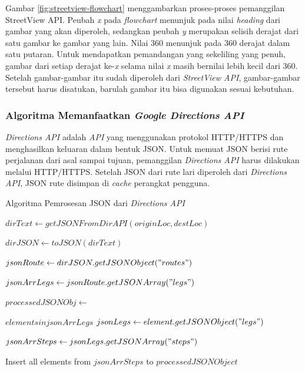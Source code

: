 Gambar \ref{fig:streetview-flowchart} menggambarkan proses-proses pemanggilan StreetView API. Peubah \textit{x} pada \textit{flowchart} menunjuk pada nilai \textit{heading} dari gambar yang akan diperoleh, sedangkan peubah \textit{y} merupakan selisih derajat dari satu gambar ke gambar yang lain. Nilai 360 menunjuk pada 360 derajat dalam satu putaran. Untuk mendapatkan pemandangan yang sekeliling yang penuh, gambar dari setiap derajat ke-\textit{x} selama nilai \textit{x} masih bernilai lebih kecil dari 360. Setelah gambar-gambar  itu sudah diperoleh dari \textit{StreetView API}, gambar-gambar tersebut harus disatukan, barulah gambar itu bisa digunakan sesuai kebutuhan.


\subsubsection{Algoritma Memanfaatkan \textit{Google Directions API}}
\textit{Directions API} adalah \textit{API} yang menggunakan protokol HTTP/HTTPS dan menghasilkan keluaran dalam bentuk JSON. Untuk memuat JSON berisi rute perjalanan dari asal sampai tujuan, pemanggilan \textit{Directions API} harus dilakukan melalui HTTP/HTTPS. Setelah  JSON dari rute lari diperoleh dari \textit{Directions API}, JSON rute disimpan di \textit{cache} perangkat pengguna.

\begin{algorithm}
	\caption{Algoritma Pemrosesan JSON dari \textit{Directions API}}
	\label{alg:algoritma-directions}
	\begin{algorithmic}[1]
		\State $dirText \gets getJSONFromDirAPI(originLoc,destLoc)$ 
		
		\State $dirJSON \gets toJSON(dirText)$	
		
		\State $jsonRoute \gets dirJSON.getJSONObject("routes")$
		
		\State $jsonArrLegs \gets jsonRoute.getJSONArray("legs")$

		\State $processedJSONObj \gets {}$		
		
		\For $ elements in jsonArrLegs$
		\State $jsonLegs \gets element.getJSONObject("legs") $

		\State $jsonArrSteps \gets jsonLegs.getJSONArray("steps")$		
		
		\State Insert all elements from $jsonArrSteps$ to $processedJSONObject$ 
			
		
		\EndFor
%		
	\EndFunction  
	\end{algorithmic}
\end{algorithm}

